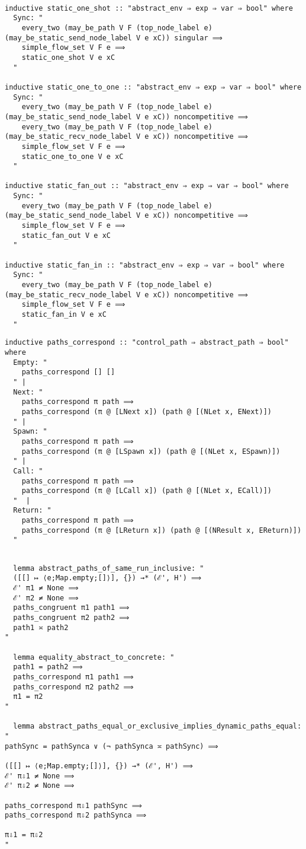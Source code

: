 \documentclass{article}
\begin{document}
\begin{lstlisting}[style=codestyle1, escapechar=\%]

inductive static_one_shot :: "abstract_env ⇒ exp ⇒ var ⇒ bool" where
  Sync: "
    every_two (may_be_path V F (top_node_label e) (may_be_static_send_node_label V e xC)) singular ⟹
    simple_flow_set V F e ⟹
    static_one_shot V e xC 
  "

inductive static_one_to_one :: "abstract_env ⇒ exp ⇒ var ⇒ bool" where
  Sync: "
    every_two (may_be_path V F (top_node_label e) (may_be_static_send_node_label V e xC)) noncompetitive ⟹
    every_two (may_be_path V F (top_node_label e) (may_be_static_recv_node_label V e xC)) noncompetitive ⟹
    simple_flow_set V F e ⟹
    static_one_to_one V e xC 
  "

inductive static_fan_out :: "abstract_env ⇒ exp ⇒ var ⇒ bool" where
  Sync: "
    every_two (may_be_path V F (top_node_label e) (may_be_static_send_node_label V e xC)) noncompetitive ⟹
    simple_flow_set V F e ⟹
    static_fan_out V e xC 
  "

inductive static_fan_in :: "abstract_env ⇒ exp ⇒ var ⇒ bool" where
  Sync: "
    every_two (may_be_path V F (top_node_label e) (may_be_static_recv_node_label V e xC)) noncompetitive ⟹
    simple_flow_set V F e ⟹
    static_fan_in V e xC 
  "

  \end{lstlisting}

\begin{lstlisting}[style=codestyle1, escapechar=\%]
  inductive paths_correspond :: "control_path ⇒ abstract_path ⇒ bool" where
  Empty: "
    paths_correspond [] []
  " |
  Next: "
    paths_correspond π path ⟹
    paths_correspond (π @ [LNext x]) (path @ [(NLet x, ENext)])
  " |
  Spawn: "
    paths_correspond π path ⟹
    paths_correspond (π @ [LSpawn x]) (path @ [(NLet x, ESpawn)])
  " |
  Call: "
    paths_correspond π path ⟹
    paths_correspond (π @ [LCall x]) (path @ [(NLet x, ECall)])
  "  |
  Return: "
    paths_correspond π path ⟹
    paths_correspond (π @ [LReturn x]) (path @ [(NResult x, EReturn)])
  " 
  \end{lstlisting}

\begin{lstlisting}[style=codestyle1, escapechar=\%]

  lemma abstract_paths_of_same_run_inclusive: "
  ([[] ↦ ⟨e;Map.empty;[]⟩], {}) →* (ℰ', H') ⟹ 
  ℰ' π1 ≠ None ⟹ 
  ℰ' π2 ≠ None ⟹ 
  paths_congruent π1 path1 ⟹
  paths_congruent π2 path2 ⟹
  path1 ≍ path2
"

  lemma equality_abstract_to_concrete: "
  path1 = path2 ⟹
  paths_correspond π1 path1 ⟹
  paths_correspond π2 path2 ⟹
  π1 = π2
"

  lemma abstract_paths_equal_or_exclusive_implies_dynamic_paths_equal: "
pathSync = pathSynca ∨ (¬ pathSynca ≍ pathSync) ⟹ 

([[] ↦ ⟨e;Map.empty;[]⟩], {}) →* (ℰ', H') ⟹
ℰ' π⇩1 ≠ None ⟹ 
ℰ' π⇩2 ≠ None ⟹ 

paths_correspond π⇩1 pathSync ⟹
paths_correspond π⇩2 pathSynca ⟹

π⇩1 = π⇩2
"


  \end{lstlisting}
\end{document}
